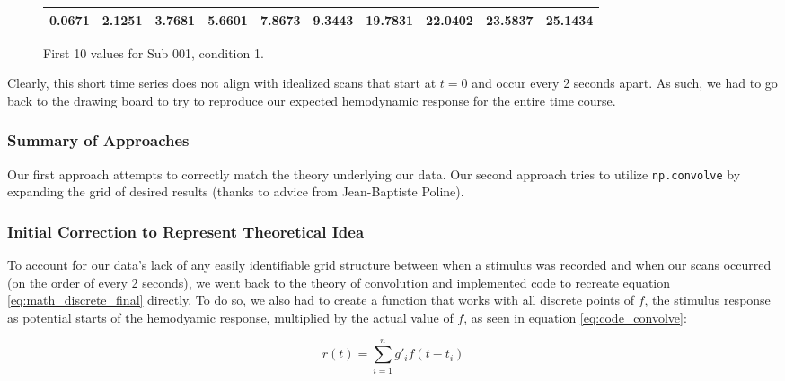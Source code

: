 \documentclass[11pt]{article}
\begin{document}
\vspace{5mm}

\begin{figure}[ht]
\begin{center}
\begin{tabular}{|cccccccccc|}
  \hline
0.0671 &
2.1251 &
3.7681 &
5.6601 &
7.8673 &
9.3443 &
19.7831 &
22.0402 &
23.5837 &
25.1434 \\
 \hline

  \end{tabular}
   \caption{First 10 values for Sub 001, condition 1.}
  \label{table:cond1}
\end{center}
\end{figure}
 
Clearly, this short time series does not align with idealized scans that 
start at $t=0$ and occur every 2 seconds apart. As such, we had to go back 
to the drawing board to try to reproduce our expected hemodynamic response for 
the entire time course.



\subsubsection{Summary of Approaches}
Our first approach attempts to correctly match the theory underlying our data. 
Our second approach tries to utilize \texttt{np.convolve} by expanding the 
grid of desired results (thanks to advice from Jean-Baptiste Poline).




\subsubsection{Initial Correction to Represent Theoretical Idea}
To account for our data's lack of any easily identifiable grid structure 
between when a stimulus was recorded and when our scans occurred (on the 
order of every 2 seconds), we went back to the theory of convolution and 
implemented code to recreate equation \ref{eq:math_discrete_final} directly. 
To do so, we also had to create a function that works with all discrete points 
of $f$, the stimulus response as potential starts of the hemodyamic response, 
multiplied by the actual value of $f$, as seen in equation 
\ref{eq:code_convolve}:

\begin{equation} \label{eq:code_convolve}
r(t)= \sum_{i=1}^n g'_{i} f(t-t_i)
\end{equation}
\end{document}

